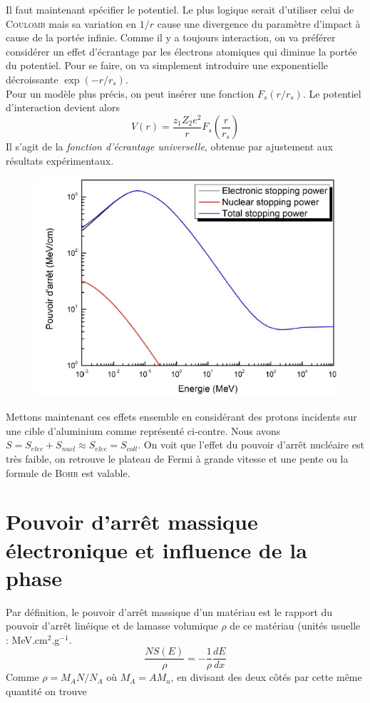 Il faut maintenant spécifier le potentiel. Le plus logique serait d'utiliser celui de \textsc{Coulomb}
mais sa variation en $1/r$ cause une divergence du paramètre d'impact à cause de la portée infinie. 
Comme il y a toujours interaction, on va préférer considérer un effet d'écrantage par les électrons
atomiques qui diminue la portée du potentiel. Pour se faire, on va simplement introduire une 
exponentielle décroissante $\exp(-r/r_s)$.\\

Pour un modèle plus précis, on peut insérer une fonction $F_s(r/r_s)$. Le potentiel d'interaction 
devient alors
\begin{equation}
V(r)=\frac{z_1Z_2e^2}{r}F_s(\frac{r}{r_s})
\end{equation}
Il s'agit de la \textit{fonction d'écrantage universelle}, obtenue par ajustement aux résultats 
expérimentaux.\\

	\begin{figure}
	\vspace{-11mm}
	\includegraphics[scale=0.34]{ch2/image8.png}
	\end{figure}
Mettons maintenant ces effets ensemble en considérant des protons incidents sur une cible 
d'aluminium comme représenté ci-contre. Nous avons $S = S_{elec} + S_{nucl} \approx S_{elec} 
= S_{coll}$. On voit que l'effet du pouvoir d'arrêt nucléaire est très faible, on retrouve
le plateau de Fermi à grande vitesse et une pente ou la formule de \textsc{Bohr} est valable.


\section{Pouvoir d'arrêt massique électronique et influence de la phase}
Par définition, le pouvoir d'arrêt massique d'un matériau est le rapport du pouvoir d'arrêt 
linéique et de lamasse volumique $\rho$ de ce matériau (unités usuelle : MeV.cm$^2$.g$^{-1}$. 
\begin{equation}
\frac{NS(E)}{\rho}=-\frac{1}{\rho}\frac{dE}{dx}
\end{equation}
Comme $\rho = M_AN/N_A$ où $M_A=AM_u$, en divisant des deux côtés par cette même quantité on 
trouve\\


